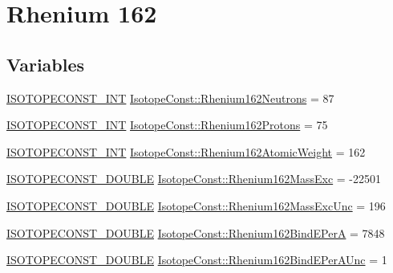 \hypertarget{group___isotope_const-_rhenium-_re162}{}\section{Rhenium 162}
\label{group___isotope_const-_rhenium-_re162}
\subsection*{Variables}
\begin{DoxyCompactItemize}
\item 
\mbox{\hyperlink{group___isotope_const-_macros_ga5f18360b3e99483a35c32d789e62621c}{I\+S\+O\+T\+O\+P\+E\+C\+O\+N\+S\+T\+\_\+\+I\+NT}} \mbox{\hyperlink{group___isotope_const-_rhenium-_re162_ga3f65bbc90165e6b6bd7e57488c8c3eca}{Isotope\+Const\+::\+Rhenium162\+Neutrons}} = 87
\item 
\mbox{\hyperlink{group___isotope_const-_macros_ga5f18360b3e99483a35c32d789e62621c}{I\+S\+O\+T\+O\+P\+E\+C\+O\+N\+S\+T\+\_\+\+I\+NT}} \mbox{\hyperlink{group___isotope_const-_rhenium-_re162_gaffff9d89895688d949e044309f5d4b1b}{Isotope\+Const\+::\+Rhenium162\+Protons}} = 75
\item 
\mbox{\hyperlink{group___isotope_const-_macros_ga5f18360b3e99483a35c32d789e62621c}{I\+S\+O\+T\+O\+P\+E\+C\+O\+N\+S\+T\+\_\+\+I\+NT}} \mbox{\hyperlink{group___isotope_const-_rhenium-_re162_ga808231b58891ff146cf24f33dfa1757c}{Isotope\+Const\+::\+Rhenium162\+Atomic\+Weight}} = 162
\item 
\mbox{\hyperlink{group___isotope_const-_macros_ga8f45a7272ce02c0b4c65c44636ed719a}{I\+S\+O\+T\+O\+P\+E\+C\+O\+N\+S\+T\+\_\+\+D\+O\+U\+B\+LE}} \mbox{\hyperlink{group___isotope_const-_rhenium-_re162_ga2f20c5b68d2ac59688597f628072d218}{Isotope\+Const\+::\+Rhenium162\+Mass\+Exc}} = -\/22501
\item 
\mbox{\hyperlink{group___isotope_const-_macros_ga8f45a7272ce02c0b4c65c44636ed719a}{I\+S\+O\+T\+O\+P\+E\+C\+O\+N\+S\+T\+\_\+\+D\+O\+U\+B\+LE}} \mbox{\hyperlink{group___isotope_const-_rhenium-_re162_gad6bc42e6309a7b00c898be8ee064d8b9}{Isotope\+Const\+::\+Rhenium162\+Mass\+Exc\+Unc}} = 196
\item 
\mbox{\hyperlink{group___isotope_const-_macros_ga8f45a7272ce02c0b4c65c44636ed719a}{I\+S\+O\+T\+O\+P\+E\+C\+O\+N\+S\+T\+\_\+\+D\+O\+U\+B\+LE}} \mbox{\hyperlink{group___isotope_const-_rhenium-_re162_ga78a023946373d9ae02e634fb567b6413}{Isotope\+Const\+::\+Rhenium162\+Bind\+E\+PerA}} = 7848
\item 
\mbox{\hyperlink{group___isotope_const-_macros_ga8f45a7272ce02c0b4c65c44636ed719a}{I\+S\+O\+T\+O\+P\+E\+C\+O\+N\+S\+T\+\_\+\+D\+O\+U\+B\+LE}} \mbox{\hyperlink{group___isotope_const-_rhenium-_re162_ga18d15cbfe6466fd7d21c5aa940d182d8}{Isotope\+Const\+::\+Rhenium162\+Bind\+E\+Per\+A\+Unc}} = 1

\end{DoxyCompactItemize}
